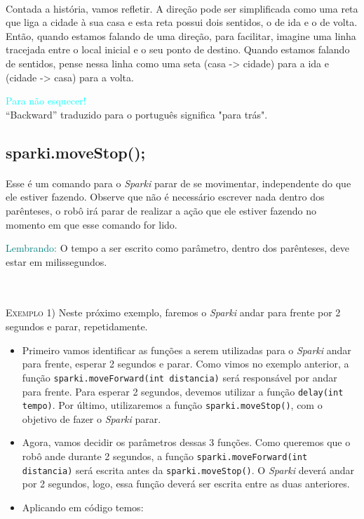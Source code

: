     \paragraph{}
    Contada a história, vamos refletir. A direção pode ser simplificada como uma reta que liga a cidade à sua casa e esta reta possui dois sentidos, o de ida e o de volta. Então, quando estamos falando de uma direção, para facilitar, imagine uma linha tracejada entre o local inicial e o seu ponto de destino. Quando estamos falando de sentidos, pense nessa linha como uma seta (casa -> cidade) para a ida e (cidade -> casa) para a volta.

    \begin{center}
    \textcolor{cyan}{Para não esquecer!} \\ ``Backward'' traduzido para o português significa "para trás".
    \end{center}
    
    
\subsection{sparki.moveStop();}
    \paragraph{}
    Esse é um comando para o \textsl{Sparki} parar de se movimentar, independente do que ele estiver fazendo. Observe que não é necessário escrever nada dentro dos parênteses, o robô irá parar de realizar a ação que ele estiver fazendo no momento em que esse comando for lido.
    
    \begin{center}
        \textcolor{teal}{Lembrando:} O tempo a ser escrito como parâmetro, dentro dos parênteses, deve estar em milissegundos.
    \end{center}
    \\~\\
    \textsc{Exemplo 1)} Neste próximo exemplo, faremos o \textsl{Sparki} andar para frente por 2 segundos e parar, repetidamente.
    
    \begin{itemize}
        \item Primeiro vamos identificar as funções a serem utilizadas para o \textsl{Sparki} andar para frente, esperar 2 segundos e parar. Como vimos no exemplo anterior, a função \texttt{sparki.moveForward(int distancia)} será responsável por andar para frente. Para esperar 2 segundos, devemos utilizar a função \texttt{delay(int tempo)}. Por último, utilizaremos a função \texttt{sparki.moveStop()}, com o objetivo de fazer o \textsl{Sparki} parar.
        \item Agora, vamos decidir os parâmetros dessas 3 funções. Como queremos que o robô ande durante 2 segundos, a função \texttt{sparki.moveForward(int distancia)} será escrita antes da \texttt{sparki.moveStop()}. O \textsl{Sparki} deverá andar por 2 segundos, logo, essa função deverá ser escrita entre as duas anteriores.
        \item Aplicando em código temos:
    \end{itemize}
    
